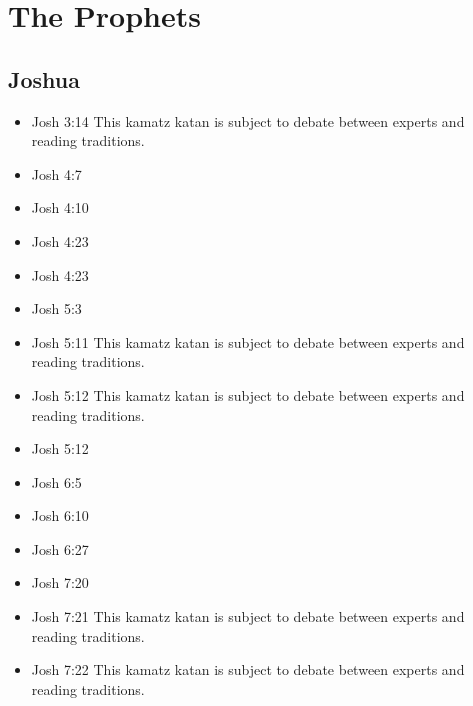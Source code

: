 \documentclass[14pt]{article}
\begin{document}
\section{The Prophets}

\subsection{Joshua}

\begin{multicols}{2}
\begin{itemize} \item Josh 3:14 This kamatz katan is subject to debate between experts and reading traditions.
	
	\item Josh 4:7
	
	\item Josh 4:10
	
	\item Josh 4:23
	
	\item Josh 4:23
	
	\item Josh 5:3
	
	\item Josh 5:11 This kamatz katan is subject to debate between experts and reading traditions.
	
	\item Josh 5:12 This kamatz katan is subject to debate between experts and reading traditions.
	
	\item Josh 5:12
	
	\item Josh 6:5
	
	\item Josh 6:10
	
	\item Josh 6:27
	
	\item Josh 7:20
	
	\item Josh 7:21 This kamatz katan is subject to debate between experts and reading traditions.
	
	\item Josh 7:22 This kamatz katan is subject to debate between experts and reading traditions.
	

\end{itemize}
\end{multicols}
\end{document}
